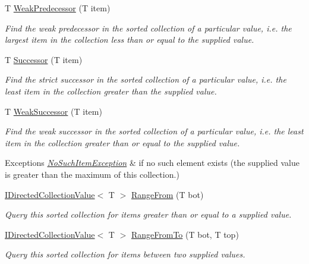 \begin{DoxyCompactItemize}
T \hyperlink{class_c5_1_1_tree_set_af51bcd7b59ffe0f474aa371ff96457b4}{Weak\+Predecessor} (T item)
\begin{DoxyCompactList}\small\item\em Find the weak predecessor in the sorted collection of a particular value, i.\+e. the largest item in the collection less than or equal to the supplied value. \end{DoxyCompactList}\item 
T \hyperlink{class_c5_1_1_tree_set_a0412f41387a36c86f9eb504928e15442}{Successor} (T item)
\begin{DoxyCompactList}\small\item\em Find the strict successor in the sorted collection of a particular value, i.\+e. the least item in the collection greater than the supplied value. \end{DoxyCompactList}\item 
T \hyperlink{class_c5_1_1_tree_set_ac32c85f8be8aa3a4029bd815531dab2d}{Weak\+Successor} (T item)
\begin{DoxyCompactList}\small\item\em Find the weak successor in the sorted collection of a particular value, i.\+e. the least item in the collection greater than or equal to the supplied value. 
\begin{DoxyExceptions}{Exceptions}
{\em \hyperlink{class_c5_1_1_no_such_item_exception}{No\+Such\+Item\+Exception}} & if no such element exists (the supplied value is greater than the maximum of this collection.)\\
\hline
\end{DoxyExceptions}
\end{DoxyCompactList}\item 
\hyperlink{interface_c5_1_1_i_directed_collection_value}{I\+Directed\+Collection\+Value}$<$ T $>$ \hyperlink{class_c5_1_1_tree_set_a597970cf26c053ec8e3eeb72abc05849}{Range\+From} (T bot)
\begin{DoxyCompactList}\small\item\em Query this sorted collection for items greater than or equal to a supplied value. \end{DoxyCompactList}\item 
\hyperlink{interface_c5_1_1_i_directed_collection_value}{I\+Directed\+Collection\+Value}$<$ T $>$ \hyperlink{class_c5_1_1_tree_set_a02a6d760946f1810f5b9ccdefe942142}{Range\+From\+To} (T bot, T top)
\begin{DoxyCompactList}\small\item\em Query this sorted collection for items between two supplied values. \end{DoxyCompactList}\item 

\end{DoxyCompactItemize}
